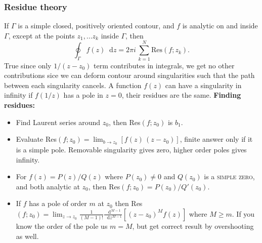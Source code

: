 \documentclass[a4paper, 10pt]{article}
\newcommand*\diff{\mathop{}\!\mathrm{d}}
\begin{document}
\begin{multicols*}{3}
\subsubsection*{Residue theory}
If $\Gamma$ is a simple closed, positively oriented contour, and $f$ is analytic on and inside $\Gamma$, except at the points $z_1,...z_k$ inside $\Gamma$, then
\begin{equation}
  \oint_{\Gamma} f(z) \diff z = 2\pi i\, \sum_{k=1}^{N} \text{Res}(f;z_k).
\end{equation}
True since only $1/(z-z_0)$ term contributes in integrals, we get no other contributions sice we can deform contour around singularities such that the path between each singularity cancels. A function $f(z)$ can have a singularity in infinity if $f(1/z)$ has a pole in $z=0$, their residues are the same.
\textbf{Finding residues:}
\begin{itemize}
  \item Find Laurent series around $z_0$, then Res$(f;z_0)$ is $b_1$.
  \item Evaluate Res$(f;z_0)=\lim_{b\rightarrow z_0} \left[f(z)\,(z-z_0)\right]$, finite answer only if it is a simple pole. Removable singularity gives zero, higher order poles gives infinity.
  \item For $f(z)=P(z)/Q(z)$ where $P(z_0)\neq 0$ and $Q(z_0)$ is a \textsc{simple zero}, and both analytic at $z_0$, then Res$(f;z_0)=P(z_0)/Q'(z_0)$.
  \item If $f$ has a pole of order $m$ at $z_0$ then Res$(f;z_0) = \lim_{z\rightarrow z_0} \frac{1}{(M-1)!}\frac{\diff^{M-1}}{\diff z^{M-1}}\left[(z-z_0)^Mf(z)\right]$ where $M \geq m$. If you know the order of the pole us $m=M$, but get correct result by overshooting as well.
\end{itemize}

\end{multicols*}
\end{document}
